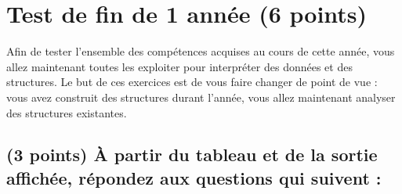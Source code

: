 \documentclass[11pt,a4paper]{article}
\begin{document}
\section{Test de fin de 1 année (6 points)}


\noindent Afin de tester l'ensemble des compétences acquises au cours de cette année, vous allez maintenant toutes les exploiter pour interpréter des données et des structures.
Le but de ces exercices est de vous faire changer de point de vue : vous avez construit des structures durant l'année, vous allez maintenant analyser des structures existantes.


\subsection{(3 points) \`A partir du tableau et de la sortie affichée, répondez aux questions qui suivent : }
\end{document}
